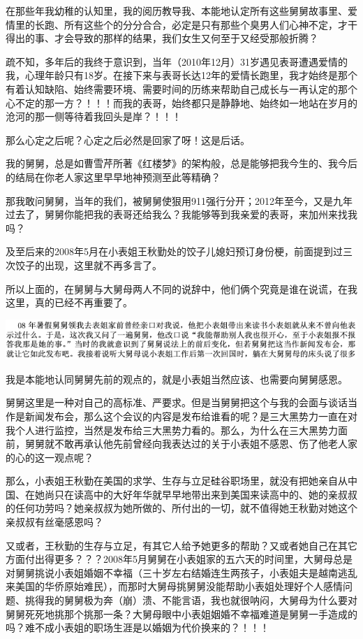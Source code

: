 \documentclass[9pt, b5paper]{article}
\begin{document}
在那些年我幼稚的认知里，我的阅历教导我、本能地认定所有这些舅舅故事里、爱情里的长跑、所有这些个的分分合合，必定是只有那些个臭男人们心神不定，才干得出的事、才会导致的那样的结果，我们女生又何至于又经受那般折腾？

疏不知，多年后的我终于意识到，当年（2010年12月）31岁遇见表哥遭遇爱情的我，心理年龄只有18岁。在接下来与表哥长达12年的爱情长跑里，我才始终是那个有着认知缺陷、始终需要环境、需要时间的历练来帮助自己成长与一再认定的那个心不定的那一方？！！！而我的表哥，始终都只是静静地、始终如一地站在岁月的沧河的那一侧等待着我回头是岸？！！！

那么心定之后呢？心定之后必然是回家了呀！这是后话。 

我的舅舅，总是如曹雪芹所著《红楼梦》的架构般，总是能够把我今生的、我今后的结局在你老人家这里早早地神预测至此等精确？

那我敢问舅舅，当年的我们，被舅舅使狠用911强行分开；2012年至今，又是九年过去了，舅舅你能把我的表哥还给我么？我能够等到我亲爱的表哥，来加州来找我吗？

及至后来的2008年5月在小表姐王秋勤处的饺子儿媳妇预订身份梗，前面提到过三次饺子的出现，这里就不再多言了。  

所以上面的，在舅舅与大舅母两人不同的说辞中，他们俩个究竟是谁在说谎，在我这里，真的已经不再重要了。 

\begin{center}
\includegraphics[width=.9\linewidth]{./pic/p1p120-6.png}
\end{center}

我是本能地认同舅舅先前的观点的，就是小表姐当然应该、也需要向舅舅感恩。 

舅舅这里是一种对自己的高标准、严要求。但是当舅舅把这个与我的会面与谈话当作是新闻发布会，那么这个会议的内容是发布给谁看的呢？是三大黑势力一直在对我个人进行监控，当然是发布给三大黑势力看的。那么，为什么在三大黑势力面前，舅舅就不敢再承认他先前曾经向我表达过的关于小表姐不感恩、伤了他老人家的心的这一观点呢？

那么，小表姐王秋勤在美国的求学、生存与立足硅谷职场里，就没有把她亲自从中国、在她尚只在读高中的大好年华就早早地带出来到美国来读高中的、她的亲叔叔的任何功劳吗？她亲叔叔为她所做的、所付出的一切，就不值得她王秋勤对她这个亲叔叔有丝毫感恩吗？

又或者，王秋勤的生存与立足，有其它人给予她更多的帮助？又或者她自己在其它方面付出得更多？？？2008年5月舅舅在小表姐家的五六天的时间里，大舅母总是对舅舅挑说小表姐婚姻不幸福（三十岁左右结婚连生两孩子，小表姐夫是越南逃乱来美国的华侨原始难民），而那时大舅母挑舅舅没能帮助小表姐处理好个人感情问题、挑得我的舅舅极为奔（崩）溃、不能言语，我也就很呐闷，大舅母为什么要对舅舅死死地挑那个挑那一条？大舅母眼中小表姐姻婚不幸福难道是舅舅一手造成的吗？难不成小表姐的职场生涯是以婚姻为代价换来的？！！！
\end{document}
